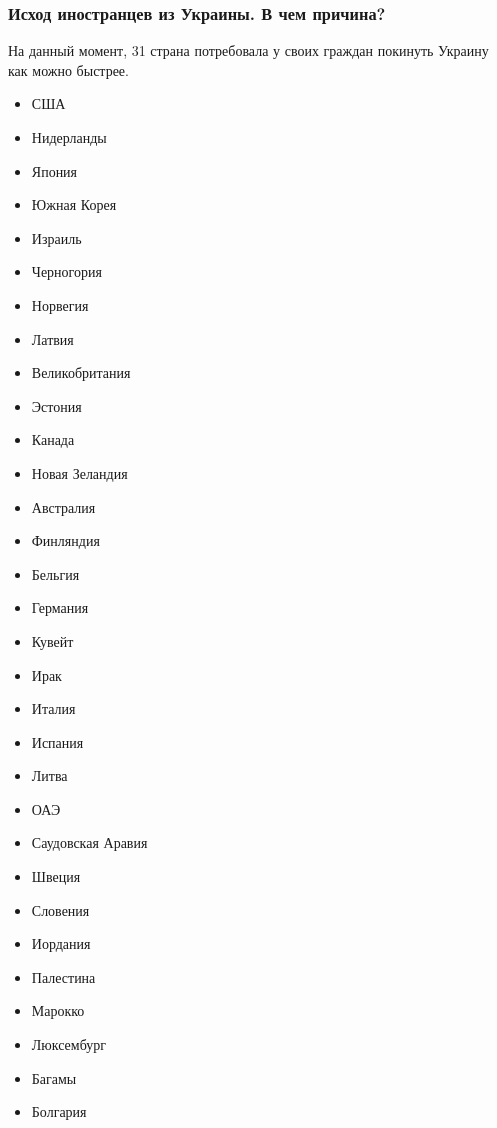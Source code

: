  
 
 
 
 

\subsubsection{Исход иностранцев из Украины. В чем причина?}

На данный момент, 31 страна потребовала у своих граждан покинуть Украину как
можно быстрее. 

\begin{itemize}
\item США
\item Нидерланды
\item Япония
\item Южная Корея
\item Израиль
\item Черногория
\item Норвегия
\item Латвия
\item Великобритания
\item Эстония
\item Канада
\item Новая Зеландия
\item Австралия
\item Финляндия
\item Бельгия
\item Германия
\item Кувейт
\item Ирак
\item Италия
\item Испания
\item Литва
\item ОАЭ
\item Саудовская Аравия
\item Швеция
\item Словения
\item Иордания
\item Палестина
\item Марокко
\item Люксембург
\item Багамы
\item Болгария
\end{itemize}

